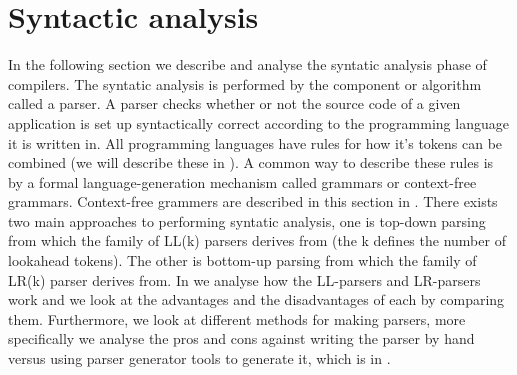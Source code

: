 \section{Syntactic analysis}

In the following section we describe and analyse the syntatic analysis phase of compilers. The syntatic analysis is performed by the component or algorithm called a parser. A parser checks whether or not the source code of a given application is set up syntactically correct according to the programming language it is written in. All programming languages have rules for how it's tokens can be combined (we will describe these in ). 
A common way to describe these rules is by a formal language-generation mechanism called grammars or context-free grammars. Context-free grammers are described in this section in . There exists two main approaches to performing syntatic analysis, one is top-down parsing from which the family of LL(k) parsers derives from (the k defines the number of lookahead tokens). The other is bottom-up parsing from which the family of LR(k) parser derives from. In  we analyse how the LL-parsers and LR-parsers work and we look at the advantages and the disadvantages of each by comparing them. Furthermore, we look at different methods for making parsers, more specifically we analyse the pros and cons against writing the parser by hand versus using parser generator tools to generate it, which is in .





